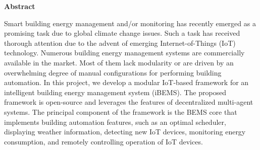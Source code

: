 
\begin{center}\textbf{Abstract}\end{center}


Smart building energy management and/or monitoring has recently emerged as a
promising task due to global climate change issues. Such a task has received thorough attention due to the advent of emerging Internet-of-Things (IoT) technology. Numerous building energy management systems are commercially available in the market. Most of them lack modularity or are driven by an overwhelming degree of manual configurations for performing building automation. In this project, we develop a modular IoT-based framework for an intelligent building energy management system (iBEMS). The proposed framework is open-source and leverages the features of decentralized multi-agent systems. The principal component of the framework is the BEMS core that implements building automation features, such as an optimal scheduler, displaying weather information, detecting new IoT devices, monitoring energy consumption, and remotely controlling operation of IoT devices.
\cleardoublepage



